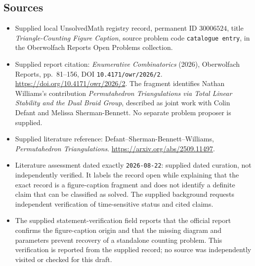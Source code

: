 \documentclass[11pt]{article}
\begin{document}
\subsection{Sources}
\begin{itemize}
\item Supplied local UnsolvedMath registry record, permanent ID \(30006524\), title \emph{Triangle-Counting Figure Caption}, source problem code \texttt{catalogue entry}, in the Oberwolfach Reports Open Problems collection.
\item Supplied report citation: \emph{Enumerative Combinatorics} (2026), Oberwolfach Reports, pp.~81--156, DOI \texttt{10.4171/owr/2026/2}. \url{https://doi.org/10.4171/owr/2026/2}. The fragment identifies Nathan Williams's contribution \emph{Permutahedron Triangulations via Total Linear Stability and the Dual Braid Group}, described as joint work with Colin Defant and Melissa Sherman-Bennett. No separate problem proposer is supplied.
\item Supplied literature reference: Defant--Sherman-Bennett--Williams, \emph{Permutahedron Triangulations}. \url{https://arxiv.org/abs/2509.11497}.
\item Literature assessment dated exactly \texttt{2026-08-22}: supplied dated curation, not independently verified. It labels the record open while explaining that the exact record is a figure-caption fragment and does not identify a definite claim that can be classified as solved. The supplied background requests independent verification of time-sensitive status and cited claims.
\item The supplied statement-verification field reports that the official report confirms the figure-caption origin and that the missing diagram and parameters prevent recovery of a standalone counting problem. This verification is reported from the supplied record; no source was independently visited or checked for this draft.
\end{itemize}
\end{document}
